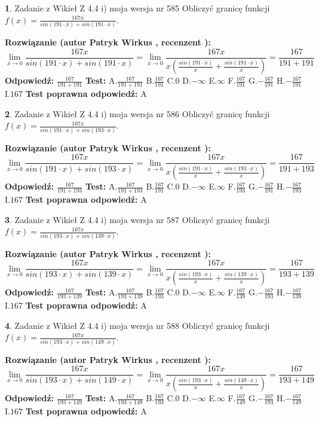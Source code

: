 \documentclass[12pt, a4paper]{article}
\theoremstyle{definition} %
\newtheorem{zad}{}
\newcommand{\zadStart}[1]{\begin{zad}#1\newline}
\newcommand{\zadStop}{\end{zad}}
\newcommand{\rozwStart}[2]{\noindent \textbf{Rozwiązanie (autor #1 , recenzent #2): }\newline}
\newcommand{\rozwStop}{\newline}
\newcommand{\odpStart}{\noindent \textbf{Odpowiedź:}\newline}
\newcommand{\odpStop}{\newline}
\newcommand{\testStart}{\noindent \textbf{Test:}\newline}
\newcommand{\testStop}{\newline}
\newcommand{\kluczStart}{\noindent \textbf{Test poprawna odpowiedź:}\newline}
\newcommand{\kluczStop}{\newline}
\begin{document}
\zadStart{Zadanie z Wikieł Z 4.4 i) moja wersja nr 585}
Obliczyć granicę funkcji $f(x)=\frac{167x}{sin(191\cdot x) +sin(191\cdot x)}$.
\zadStop
\rozwStart{Patryk Wirkus}{}
$$\lim\limits_{x\to 0}\frac{167x}{sin(191\cdot x) +sin(191\cdot x)}=\lim\limits_{x\to 0}\frac{167x}{x(\frac{sin(191\cdot x)}{x}+\frac{sin(191\cdot x)}{x})}=\frac{167}{191+191}$$
\rozwStop
\odpStart
$\frac{167}{191+191}$
\odpStop
\testStart
A.$\frac{167}{191+191}$
B.$\frac{167}{191}$
C.$0$
D.$-\infty$
E.$\infty$
F.$\frac{167}{191}$
G.$-\frac{167}{191}$
H.$-\frac{167}{191}$
I.$167$
\testStop
\kluczStart
A
\kluczStop



\zadStart{Zadanie z Wikieł Z 4.4 i) moja wersja nr 586}
Obliczyć granicę funkcji $f(x)=\frac{167x}{sin(191\cdot x) +sin(193\cdot x)}$.
\zadStop
\rozwStart{Patryk Wirkus}{}
$$\lim\limits_{x\to 0}\frac{167x}{sin(191\cdot x) +sin(193\cdot x)}=\lim\limits_{x\to 0}\frac{167x}{x(\frac{sin(191\cdot x)}{x}+\frac{sin(193\cdot x)}{x})}=\frac{167}{191+193}$$
\rozwStop
\odpStart
$\frac{167}{191+193}$
\odpStop
\testStart
A.$\frac{167}{191+193}$
B.$\frac{167}{191}$
C.$0$
D.$-\infty$
E.$\infty$
F.$\frac{167}{193}$
G.$-\frac{167}{191}$
H.$-\frac{167}{193}$
I.$167$
\testStop
\kluczStart
A
\kluczStop



\zadStart{Zadanie z Wikieł Z 4.4 i) moja wersja nr 587}
Obliczyć granicę funkcji $f(x)=\frac{167x}{sin(193\cdot x) +sin(139\cdot x)}$.
\zadStop
\rozwStart{Patryk Wirkus}{}
$$\lim\limits_{x\to 0}\frac{167x}{sin(193\cdot x) +sin(139\cdot x)}=\lim\limits_{x\to 0}\frac{167x}{x(\frac{sin(193\cdot x)}{x}+\frac{sin(139\cdot x)}{x})}=\frac{167}{193+139}$$
\rozwStop
\odpStart
$\frac{167}{193+139}$
\odpStop
\testStart
A.$\frac{167}{193+139}$
B.$\frac{167}{193}$
C.$0$
D.$-\infty$
E.$\infty$
F.$\frac{167}{139}$
G.$-\frac{167}{193}$
H.$-\frac{167}{139}$
I.$167$
\testStop
\kluczStart
A
\kluczStop



\zadStart{Zadanie z Wikieł Z 4.4 i) moja wersja nr 588}
Obliczyć granicę funkcji $f(x)=\frac{167x}{sin(193\cdot x) +sin(149\cdot x)}$.
\zadStop
\rozwStart{Patryk Wirkus}{}
$$\lim\limits_{x\to 0}\frac{167x}{sin(193\cdot x) +sin(149\cdot x)}=\lim\limits_{x\to 0}\frac{167x}{x(\frac{sin(193\cdot x)}{x}+\frac{sin(149\cdot x)}{x})}=\frac{167}{193+149}$$
\rozwStop
\odpStart
$\frac{167}{193+149}$
\odpStop
\testStart
A.$\frac{167}{193+149}$
B.$\frac{167}{193}$
C.$0$
D.$-\infty$
E.$\infty$
F.$\frac{167}{149}$
G.$-\frac{167}{193}$
H.$-\frac{167}{149}$
I.$167$
\testStop
\kluczStart
A
\kluczStop
\end{document}
